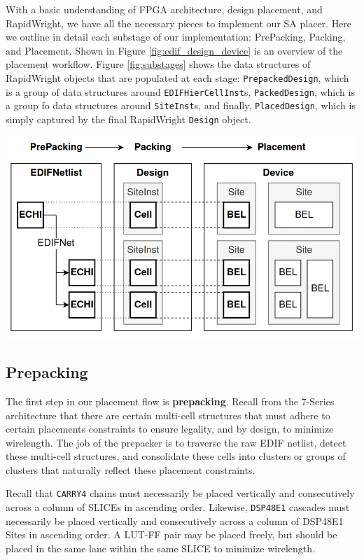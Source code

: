 \begin{multicols}{2}
\label{sec:simulated_annealing}
With a basic understanding of FPGA architecture, design placement, and RapidWright, we have all the necessary pieces to implement our SA placer. 
Here we outline in detail each substage of our implementation: PrePacking, Packing, and Placement. 
Shown in Figure \ref{fig:edif_design_device} is an overview of the placement workflow. 
Figure \ref{fig:substages} shows the data structures of RapidWright objects that are populated at each stage: \texttt{PrepackedDesign}, which is a group of data structures around \texttt{EDIFHierCellInst}s, \texttt{PackedDesign}, which is a group fo data structures around \texttt{SiteInst}s, and finally, \texttt{PlacedDesign}, which is simply captured by the final RapidWright \texttt{Design} object. 

\vspace{0.5cm}
{
    \centering
    \includegraphics[width=0.9\columnwidth]{figures/edif_design_device.png}
    \label{fig:edif_design_device}
}


\subsection{Prepacking}
\label{subsec:prepacking}


The first step in our placement flow is \textbf{prepacking}. 
Recall from the 7-Series architecture that there are certain multi-cell structures that must adhere to certain placements constraints to ensure legality, and by design, to minimize wirelength. 
The job of the prepacker is to traverse the raw EDIF netlist, detect these multi-cell structures, and consolidate these cells into clusters or groups of clusters that naturally reflect these placement constraints. 

Recall that \texttt{CARRY4} chains must necessarily be placed vertically and consecutively across a column of SLICEs in ascending order. 
Likewise, \texttt{DSP48E1} cascades must necessarily be placed vertically and consecutively across a column of DSP48E1 Sites in ascending order. 
A LUT-FF pair may be placed freely, but should be placed in the same lane within the same SLICE to minimize wirelength.


\end{multicols}
